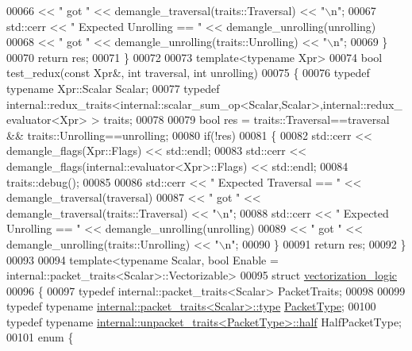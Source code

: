 \begin{DoxyCode}
00066               << \textcolor{stringliteral}{" got "} << demangle\_traversal(traits::Traversal) << \textcolor{stringliteral}{"\(\backslash\)n"};
00067     std::cerr << \textcolor{stringliteral}{" Expected Unrolling == "} << demangle\_unrolling(unrolling)
00068               << \textcolor{stringliteral}{" got "} << demangle\_unrolling(traits::Unrolling) << \textcolor{stringliteral}{"\(\backslash\)n"};
00069   \}
00070   \textcolor{keywordflow}{return} res;
00071 \}
00072 
00073 \textcolor{keyword}{template}<\textcolor{keyword}{typename} Xpr>
00074 \textcolor{keywordtype}{bool} test\_redux(\textcolor{keyword}{const} Xpr&, \textcolor{keywordtype}{int} traversal, \textcolor{keywordtype}{int} unrolling)
00075 \{
00076   \textcolor{keyword}{typedef} \textcolor{keyword}{typename} Xpr::Scalar Scalar;
00077   \textcolor{keyword}{typedef} internal::redux\_traits<internal::scalar\_sum\_op<Scalar,Scalar>,internal::redux\_evaluator<Xpr> > 
      traits;
00078   
00079   \textcolor{keywordtype}{bool} res = traits::Traversal==traversal && traits::Unrolling==unrolling;
00080   \textcolor{keywordflow}{if}(!res)
00081   \{
00082     std::cerr << demangle\_flags(Xpr::Flags) << std::endl;
00083     std::cerr << demangle\_flags(internal::evaluator<Xpr>::Flags) << std::endl;
00084     traits::debug();
00085     
00086     std::cerr << \textcolor{stringliteral}{" Expected Traversal == "} << demangle\_traversal(traversal)
00087               << \textcolor{stringliteral}{" got "} << demangle\_traversal(traits::Traversal) << \textcolor{stringliteral}{"\(\backslash\)n"};
00088     std::cerr << \textcolor{stringliteral}{" Expected Unrolling == "} << demangle\_unrolling(unrolling)
00089               << \textcolor{stringliteral}{" got "} << demangle\_unrolling(traits::Unrolling) << \textcolor{stringliteral}{"\(\backslash\)n"};
00090   \}
00091   \textcolor{keywordflow}{return} res;
00092 \}
00093 
00094 template<typename Scalar, bool Enable = internal::packet\_traits<Scalar>::Vectorizable>
00095 \textcolor{keyword}{struct }\hyperlink{structvectorization__logic}{vectorization\_logic}
00096 \{
00097   \textcolor{keyword}{typedef} internal::packet\_traits<Scalar> PacketTraits;
00098   
00099   \textcolor{keyword}{typedef} \textcolor{keyword}{typename} \hyperlink{group___sparse_core___module}{internal::packet\_traits<Scalar>::type} 
      \hyperlink{struct_eigen_1_1_packet_type}{PacketType};
00100   \textcolor{keyword}{typedef} \textcolor{keyword}{typename} \hyperlink{union_eigen_1_1internal_1_1_packet}{internal::unpacket\_traits<PacketType>::half} 
      HalfPacketType;
00101   \textcolor{keyword}{enum} \{

\end{DoxyCode}
